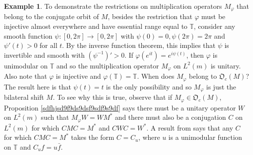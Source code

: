 \documentclass{dis}
\theoremstyle{plain}
\theoremstyle{definition}
\newtheorem{Example}[equation]{Example}
\def\T{\mathbb{T}}
\renewcommand{\phi}{\varphi}
\newcommand{\0}{{\color{lightgray}0}}
\begin{document}
\begin{Example}\label{examplecalculus}
To demonstrate the restrictions on multiplication operators $M_{\phi}$ that belong to the conjugate orbit of $M$, besides the restriction that $\phi$ must be injective almost everywhere and have essential range equal to $\T$, consider any smooth function $\psi: [0, 2 \pi] \to [0, 2 \pi]$ with $\psi(0) = 0, \psi(2 \pi) = 2 \pi$ and $\psi'(t) > 0$ for all $t$. By the inverse function theorem, this implies that $\psi$ is invertible and smooth with $(\psi^{-1})' > 0$. If $\phi(e^{i t}) = e^{i \psi(t)}$, then $\phi$ is unimodular on $\T$ and so the multiplication operator $M_{\phi}$ on $L^2(m)$ is unitary. Also note that $\phi$ is injective and $\phi(\T) = \T$. When does $M_{\phi}$ belong to $\mathfrak{O}_c(M)$? The result here is that $\psi(t) = t$ is the only possibility  and so $M_{\phi}$ is just the bilateral shift  $M$. To see why  this is true, observe that if $M_{\phi} \in \mathfrak{O}_c(M)$, Proposition \ref{sdfhjsd9f9ds9dsf9sdf9s9df} says  there must be a unitary operator $W$ on $L^2(m)$ such that $M_{\phi} W = W M^{*}$ and there must also be a conjugation $C$ on $L^2(m)$ for which $C M C = M^{*}$ and $C W C = W^{*}$. A result from \cite{MR4169409} says that any $C$ for which $C M C = M^{*}$ takes the form $C = C_{u}$, where $u$ is a unimodular function on $\T$ and $C_{u} f = u \bar{f}$. 


\end{Example}
\end{document}
